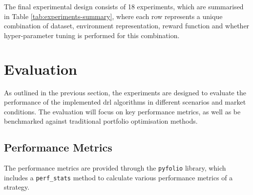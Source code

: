 The final experimental design consists of 18 experiments, which are summarised in Table \ref{tab:experiments-summary}, where each row represents a unique combination of dataset, environment representation, reward function and whether hyper-parameter tuning is performed for this combination.



\section{Evaluation} \label{sec:evaluation}

As outlined in the previous section, the experiments are designed to evaluate the performance of the implemented \acrshort{drl} algorithms in different scenarios and market conditions. The evaluation will focus on key performance metrics, as well as be benchmarked against traditional portfolio optimisation methods. 

\subsection{Performance Metrics} \label{sec:performance-metrics}

The performance metrics are provided through the \texttt{pyfolio} library, which includes a \texttt{perf\_stats} method to calculate various performance metrics of a strategy. 

